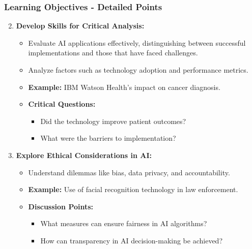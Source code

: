 \documentclass{beamer}
\begin{document}
\begin{frame}[fragile]
    \frametitle{Learning Objectives - Detailed Points}
    \begin{enumerate}
        \setcounter{enumi}{1} %
        \item \textbf{Develop Skills for Critical Analysis:}
        \begin{itemize}
            \item Evaluate AI applications effectively, distinguishing between successful implementations and those that have faced challenges.
            \item Analyze factors such as technology adoption and performance metrics.
            \item \textbf{Example:} IBM Watson Health's impact on cancer diagnosis.
            \item \textbf{Critical Questions:}
            \begin{itemize}
                \item Did the technology improve patient outcomes?
                \item What were the barriers to implementation?
            \end{itemize}
        \end{itemize}
        
        \item \textbf{Explore Ethical Considerations in AI:}
        \begin{itemize}
            \item Understand dilemmas like bias, data privacy, and accountability.
            \item \textbf{Example:} Use of facial recognition technology in law enforcement.
            \item \textbf{Discussion Points:}
            \begin{itemize}
                \item What measures can ensure fairness in AI algorithms?
                \item How can transparency in AI decision-making be achieved?
            \end{itemize}
        \end{itemize}
    \end{enumerate}
\end{frame}
\end{document}
